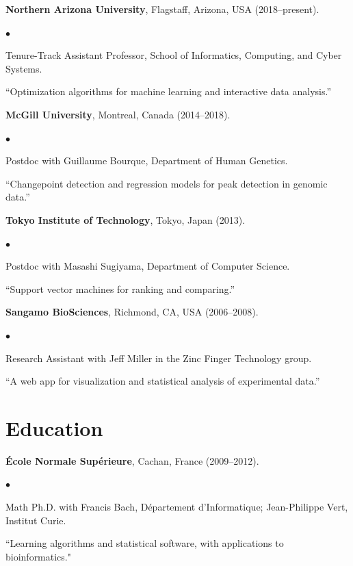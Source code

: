 \documentclass[margin,line]{res}
\newenvironment{list2}{
  \begin{list}{$\bullet$}{%
      \setlength{\itemsep}{0in}
      \setlength{\parsep}{0in} \setlength{\parskip}{0in}
      \setlength{\topsep}{0in} \setlength{\partopsep}{0in} 
      \setlength{\leftmargin}{0.2in}}}{\end{list}}
\begin{document}
\begin{resume}
{\bf Northern Arizona University}, Flagstaff, Arizona, USA (2018--present).\\
\vspace*{-.1in}
\begin{list2}
\item[] Tenure-Track Assistant Professor, School of Informatics, Computing, and Cyber Systems.
\item[] ``Optimization algorithms for machine learning and interactive data analysis.''
\end{list2}

{\bf McGill University}, Montreal, Canada (2014--2018).\\
\vspace*{-.1in}
\begin{list2}
\item[] Postdoc with Guillaume Bourque, Department of Human Genetics.
\item[]``Changepoint detection and regression models for peak detection in genomic data.''
\end{list2}

{\bf Tokyo Institute of Technology}, Tokyo, Japan (2013).\\
\vspace*{-.1in}
\begin{list2}
\item[] Postdoc with Masashi Sugiyama, Department of Computer Science.
\item[] ``Support vector machines for ranking and comparing.''
\end{list2}

{\bf Sangamo BioSciences}, Richmond, CA, USA (2006--2008).\\
\vspace*{-.1in}
\begin{list2}
\item[] Research Assistant with Jeff Miller in the Zinc Finger Technology group.
\item[] ``A web app for visualization and statistical analysis of experimental data.''
\end{list2}

\section{\sc Education}

{\bf \'{E}cole Normale Sup\'{e}rieure}, Cachan, France (2009--2012).\\
\vspace*{-.1in}
\begin{list2}
\item[] Math Ph.D. with Francis Bach, D\'{e}partement d'Informatique; Jean-Philippe Vert, Institut Curie.
\item[] ``Learning algorithms and statistical software, with applications to bioinformatics."
\end{list2}


\end{resume}
\end{document}
